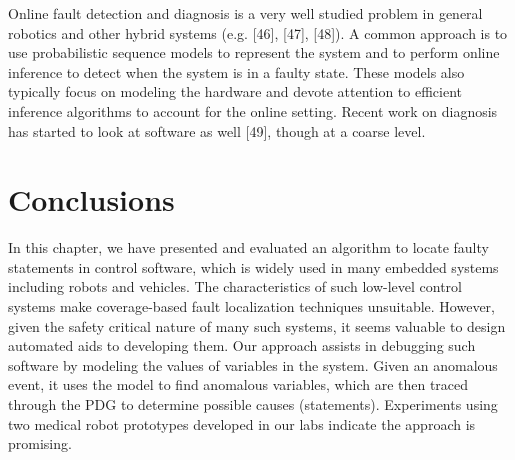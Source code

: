 Online fault detection and diagnosis is a very well studied problem in general robotics and other hybrid systems (e.g. [46], [47], [48]). A common approach is to use probabilistic sequence models to represent the system and to perform online inference to detect when the system is in a faulty state. These models also typically focus on modeling the hardware and devote attention to efficient inference algorithms to account for the online setting. Recent work on diagnosis has started to look at software as well [49], though at a coarse level.

\section{Conclusions}
In this chapter, we have presented and evaluated an algorithm to locate faulty statements in control software, which is widely used in many embedded systems including robots
and vehicles. The characteristics of such low-level control systems make coverage-based fault localization techniques unsuitable. However, given the safety critical nature of many
such systems, it seems valuable to design automated aids to developing them. Our approach assists in debugging such software by modeling the values of variables in the system. Given an anomalous event, it uses the model to find anomalous variables, which are then traced through the PDG to determine possible causes (statements). Experiments using two medical robot prototypes developed in our labs indicate the approach is promising.
